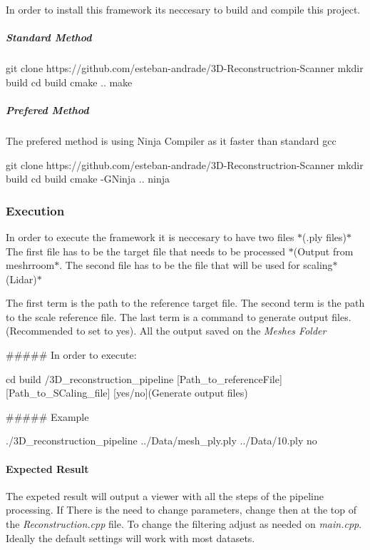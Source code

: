 In order to install this framework its neccesary to build and compile this project.

\subparagraph*{Standard Method}


\begin{DoxyCode}
git clone https://github.com/esteban-andrade/3D-Reconstructrion-Scanner
mkdir build
cd build
cmake ..
make
\end{DoxyCode}
 \subparagraph*{Prefered Method}

The prefered method is using Ninja Compiler as it faster than standard gcc


\begin{DoxyCode}
git clone https://github.com/esteban-andrade/3D-Reconstructrion-Scanner
mkdir build
cd build
cmake -GNinja ..
ninja
\end{DoxyCode}


\subsubsection*{Execution}

In order to execute the framework it is neccesary to have two files $\ast$(.ply files)$\ast$ The first file has to be the target file that needs to be processed $\ast$(Output from meshrroom$\ast$. The second file has to be the file that will be used for scaling$\ast$(Lidar)$\ast$

The first term is the path to the reference target file. The second term is the path to the scale reference file. The last term is a command to generate output files. (Recommended to set to yes). All the output saved on the {\itshape Meshes Folder}

\#\#\#\#\# In order to execute\+: 
\begin{DoxyCode}
cd build 
/3D\_reconstruction\_pipeline [Path\_to\_referenceFile] [Path\_to\_SCaling\_file] [yes/no](Generate output files)
\end{DoxyCode}


\#\#\#\#\# Example 
\begin{DoxyCode}
./3D\_reconstruction\_pipeline ../Data/mesh\_ply.ply ../Data/10.ply no
\end{DoxyCode}


\paragraph*{Expected Result}

The expeted result will output a viewer with all the steps of the pipeline processing. If There is the need to change parameters, change then at the top of the {\itshape Reconstruction.\+cpp} file. To change the filtering adjust as needed on {\itshape main.\+cpp}. Ideally the default settings will work with most datasets.

